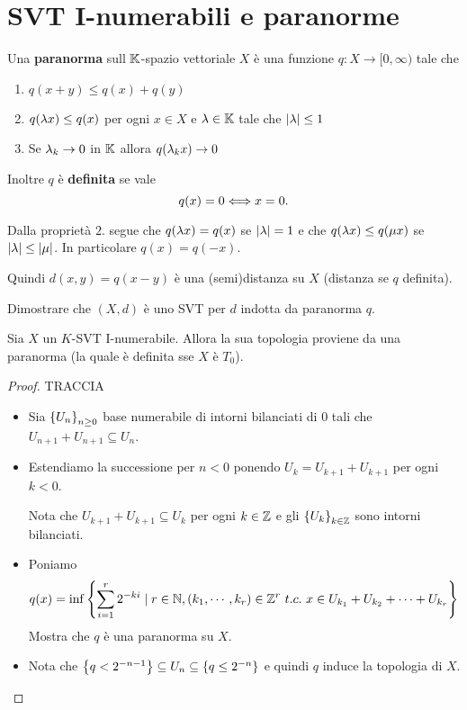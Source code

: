 \section{SVT I-numerabili e paranorme}
\begin{definition}[Paranorma]
Una \textbf{paranorma} sull $\mathbb{K}$-spazio vettoriale $X$ \`e una funzione $q:X\to[0,\infty)$ tale che
\begin{enumerate}
    \item $q(x+y)\leq q(x)+q(y)$
    \item $q(\lambda x)\leq q(x)$ per ogni $x\in X$ e $\lambda\in\mathbb{K}$ tale che $\left|{\lambda}\right|\leq 1$
    \item Se $\lambda_k\to 0$ in $\mathbb{K}$ allora $q(\lambda_k x)\to 0$
\end{enumerate}
Inoltre $q$ \`e \textbf{definita} se vale
\[q(x)=0\Longleftrightarrow x=0.\]
\end{definition}

\begin{remark}
Dalla propriet\`a $2.$ segue che $q(\lambda x)=q(x)$ se $\left|{\lambda}\right|=1$ e che $q(\lambda x)\leq q(\mu x)$ se $\left|{\lambda}\right|\leq\left|{\mu}\right|$. In particolare $q(x)=q(-x)$.

Quindi $d(x,y)=q(x-y)$ \`e una (semi)distanza su $X$ (distanza se $q$ definita).
\end{remark}

\begin{exercise}
Dimostrare che $(X,d)$ \`e uno SVT per $d$ indotta da paranorma $q$.
\end{exercise}

\begin{exercise}
Sia $X$ un $K$-SVT I-numerabile. Allora la sua topologia proviene da una paranorma (la quale \`e definita sse $X$ \`e $T_0$).
\end{exercise}
\begin{proof}
TRACCIA
\begin{itemize}
    \item Sia $\left\{{U_n}\right\}_{n\geq 0}$ base numerabile di intorni bilanciati di $0$ tali che $U_{n+1}+U_{n+1}\subseteq U_n$.
    \item Estendiamo la successione per $n<0$ ponendo $U_k=U_{k+1}+U_{k+1}$ per ogni $k<0$.
    
    Nota che $U_{k+1}+U_{k+1}\subseteq U_k$ per ogni $k\in \mathbb{Z}$ e gli $\left\{{U_k}\right\}_{k\in\mathbb{Z}}$ sono intorni bilanciati. 
    \item Poniamo
    \[q(x)=\inf\left\{{\sum_{i=1}^r2^{-ki}\mid r\in\mathbb{N},(k_1,\cdots, k_r)\in\mathbb{Z}^r\ t.c.\ x\in U_{k_1}+U_{k_2}+\cdots+U_{k_r}}\right\}\]
    Mostra che $q$ \`e una paranorma su $X$.
    \item Nota che $\left\{{q<2^{-n-1}}\right\}\subseteq U_n\subseteq \left\{{q\leq 2^{-n}}\right\}$ e quindi $q$ induce la topologia di $X$.
\end{itemize}
\end{proof}